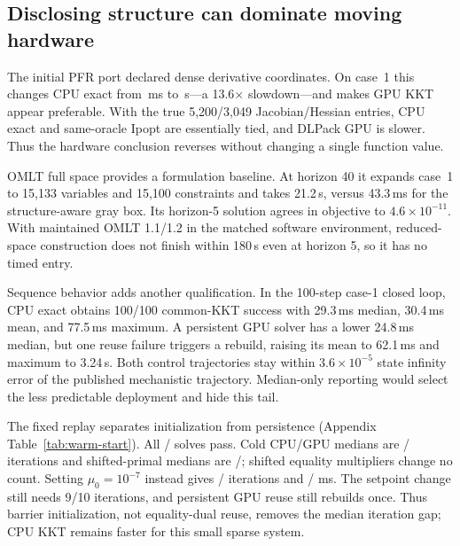 \subsection{Disclosing structure can dominate moving hardware}
\label{sec:sparsity-results}

The initial PFR port declared dense derivative coordinates.  On case~1 this
changes CPU exact from \PFRCaseOneSparseCPU\,ms to
\PFRCaseOneDenseCPU\,s---a 13.6$\times$ slowdown---and makes GPU KKT appear
preferable.  With the true 5,200/3,049 Jacobian/Hessian entries, CPU exact and
same-oracle Ipopt are essentially tied, and DLPack GPU is slower.  Thus the
hardware conclusion reverses without changing a single function value.

OMLT full space provides a formulation baseline.  At horizon 40 it expands
case~1 to 15,133 variables and 15,100 constraints and takes 21.2\,s, versus
43.3\,ms for the structure-aware gray box.  Its horizon-5 solution agrees in
objective to $4.6\times10^{-11}$.  With maintained OMLT 1.1/1.2 in the
matched software environment, reduced-space construction does not finish
within 180\,s even at horizon 5, so it has no timed entry.

Sequence behavior adds another qualification.  In the 100-step case-1 closed
loop, CPU exact obtains 100/100 common-KKT success with 29.3\,ms median,
30.4\,ms mean, and 77.5\,ms maximum.  A persistent GPU solver has a lower
24.8\,ms median, but one reuse failure triggers a rebuild, raising its mean to
62.1\,ms and maximum to 3.24\,s.  Both control trajectories stay within
$3.6\times10^{-5}$ state infinity error of the published mechanistic
trajectory.  Median-only reporting would select the less predictable
deployment and hide this tail.

The fixed replay separates initialization from persistence
(Appendix Table~\ref{tab:warm-start}).  All \PFRSequenceSuccesses/
\PFRSequenceTotal{} solves pass.  Cold CPU/GPU medians are
\PFRWarmCPUColdIter/\PFRWarmGPUColdIter{} iterations and shifted-primal medians
are \PFRWarmCPUPrimalIter/\PFRWarmGPUPrimalIter; shifted equality multipliers
change no count.  Setting $\mu_0=10^{-7}$ instead gives
\PFRWarmCPUBarrierIter/\PFRWarmGPUBarrierIter{} iterations and
\PFRWarmCPUBarrierTime/\PFRWarmGPUBarrierTime{} ms.  The setpoint change still
needs 9/10 iterations, and persistent GPU reuse still rebuilds once.  Thus
barrier initialization, not equality-dual reuse, removes the median iteration
gap; CPU KKT remains faster for this small sparse system.

